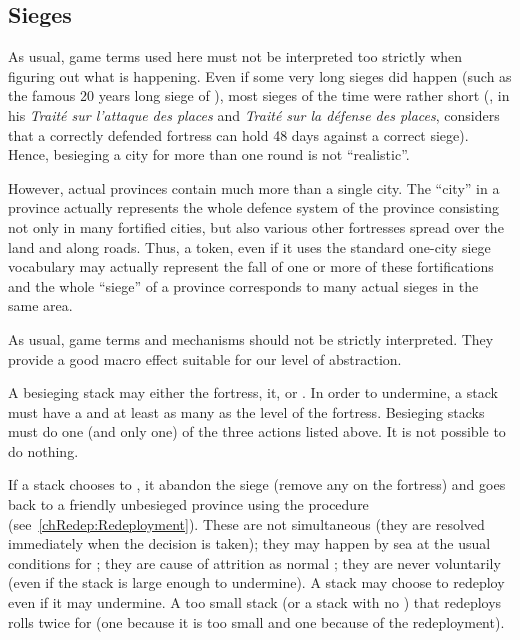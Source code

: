 \subsection{Sieges}
\begin{designnote}
  As usual, game terms used here must not be interpreted too strictly when
  figuring out what is happening. Even if some very long sieges did happen
  (such as the famous 20 years long siege of ), most sieges of
  the time were rather short (, in his \emph{Traité sur
    l'attaque des places} and \emph{Traité sur la défense des places},
  considers that a correctly defended fortress can hold 48 days against a
  correct siege). Hence, besieging a city for more than one round is not
  ``realistic''.

  However, actual provinces contain much more than a single city. The ``city''
  in a province actually represents the whole defence system of the province
  consisting not only in many fortified cities, but also various other
  fortresses spread over the land and along roads. Thus, a \USURE token, even
  if it uses the standard one-city siege vocabulary may actually represent the
  fall of one or more of these fortifications and the whole ``siege'' of a
  province corresponds to many actual sieges in the same area.

  As usual, game terms and mechanisms should not be strictly interpreted. They
  provide a good macro effect suitable for our level of abstraction.
\end{designnote}

A besieging stack may either  the fortress, 
it, or . In order to undermine, a stack must have a \LoS and
at least as many \LD as the level of the fortress. Besieging stacks must do
one (and only one) of the three actions listed above. It is not possible to do
nothing.

If a stack chooses to , it abandon the siege (remove any
\USURE on the fortress) and goes back to a friendly unbesieged province using
the  procedure (see~\ref{chRedep:Redeployment}). These
 are not simultaneous (they are resolved immediately when
the decision is taken); they may happen by sea at the usual conditions for
; they are cause of attrition as normal
; they are never voluntarily (even if the stack is large
enough to undermine). A stack may choose to redeploy even if it may
undermine. A too small stack (or a stack with no \LoS) that redeploys rolls
twice for  (one  because it is too
small and one  because of the redeployment).

